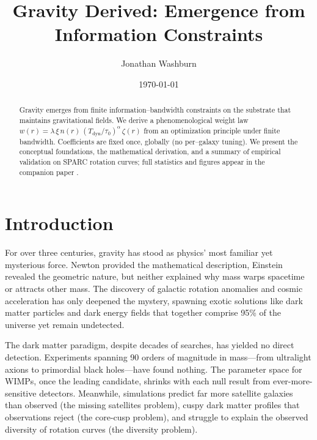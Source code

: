 \documentclass[twocolumn,prd,amsmath,amssymb,aps,superscriptaddress,nofootinbib]{revtex4-2}
\begin{document}
\title{Gravity Derived: Emergence from Information Constraints}

\author{Jonathan Washburn}

\date{\today}

\begin{abstract}
\noindent
Gravity emerges from finite information–bandwidth constraints on the substrate that maintains gravitational fields. We derive a phenomenological weight law $w(r)=\lambda\,\xi\,n(r)\,(T_{\text{dyn}}/\tau_0)^\alpha\,\zeta(r)$ from an optimization principle under finite bandwidth. Coefficients are fixed once, globally (no per–galaxy tuning). We present the conceptual foundations, the mathematical derivation, and a summary of empirical validation on SPARC rotation curves; full statistics and figures appear in the companion paper \cite{Washburn2025a}.
\end{abstract}

\maketitle

\section{Introduction}

For over three centuries, gravity has stood as physics' most familiar yet mysterious force. Newton provided the mathematical description, Einstein revealed the geometric nature, but neither explained why mass warps spacetime or attracts other mass. The discovery of galactic rotation anomalies \cite{Rubin1970} and cosmic acceleration \cite{Riess1998} has only deepened the mystery, spawning exotic solutions like dark matter particles and dark energy fields that together comprise 95\% of the universe yet remain undetected.

The dark matter paradigm, despite decades of searches, has yielded no direct detection. Experiments spanning 90 orders of magnitude in mass---from ultralight axions to primordial black holes---have found nothing. The parameter space for WIMPs, once the leading candidate, shrinks with each null result from ever-more-sensitive detectors. Meanwhile, simulations predict far more satellite galaxies than observed (the missing satellites problem), cuspy dark matter profiles that observations reject (the core-cusp problem), and struggle to explain the observed diversity of rotation curves (the diversity problem).
\end{document}
